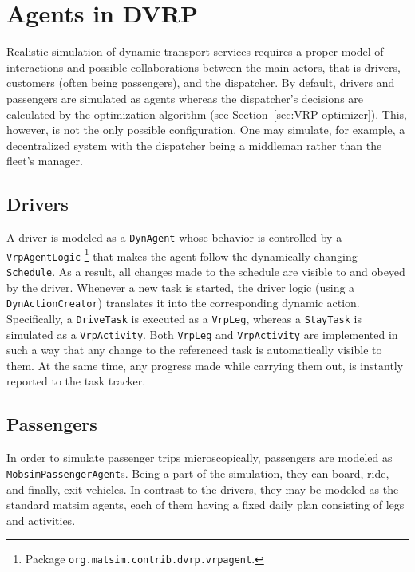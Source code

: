 \section{Agents in DVRP}
Realistic simulation of dynamic transport services requires a proper model of interactions and possible collaborations between the main actors, that is drivers, customers (often being passengers), and the dispatcher. By default, drivers and passengers are simulated as agents whereas the dispatcher's decisions are calculated by the optimization algorithm (see Section~\ref{sec:VRP-optimizer}). This, however, is not the only possible configuration. One may simulate, for example, a decentralized system with the dispatcher being a middleman rather than the fleet's manager.

\subsection{Drivers}
\label{sec:VRP-agent}
A driver is modeled as a \lstinline$DynAgent$ whose behavior is controlled by a \lstinline$VrpAgentLogic$%
\footnote{
Package \lstinline$org.matsim.contrib.dvrp.vrpagent$.
}
that makes the agent follow the dynamically changing \lstinline$Schedule$. As a result, all changes made to the schedule are visible to and obeyed by the driver. Whenever a new task is started, the driver logic (using a \lstinline$DynActionCreator$) translates it into the corresponding dynamic action. Specifically, a \lstinline$DriveTask$ is executed as a \lstinline$VrpLeg$, whereas a \lstinline$StayTask$ is simulated as a \lstinline$VrpActivity$. Both \lstinline$VrpLeg$ and \lstinline$VrpActivity$ are implemented in such a way that any change to the referenced task is automatically visible to them. At the same time, any progress made while carrying them out, is instantly reported to the task tracker.

\subsection{Passengers}
\label{sec:VRP-passengers}
In order to simulate passenger trips microscopically, passengers are modeled as \lstinline$MobsimPassengerAgent$s. Being a part of the simulation, they can board, ride, and finally, exit vehicles. In contrast to the drivers, they may be modeled as the standard \gls{matsim} agents, each of them having a fixed daily plan consisting of legs and activities.


